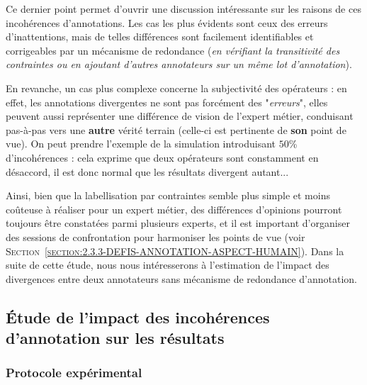 			\begin{leftBarAuthorOpinion}
				Ce dernier point permet d'ouvrir une discussion intéressante sur les raisons de ces incohérences d'annotations.
				Les cas les plus évidents sont ceux des erreurs d’inattentions, mais de telles différences sont facilement identifiables et corrigeables par un mécanisme de redondance (\textit{en vérifiant la transitivité des contraintes ou en ajoutant d'autres annotateurs sur un même lot d'annotation}).
				
				En revanche, un cas plus complexe concerne la subjectivité des opérateurs :
				en effet, les annotations divergentes ne sont pas forcément des "\textit{erreurs}", elles peuvent aussi représenter une différence de vision de l'expert métier, conduisant pas-à-pas vers une \textbf{autre} vérité terrain (celle-ci est pertinente de \textbf{son} point de vue).
				On peut prendre l'exemple de la simulation introduisant $50$\% d'incohérences : cela exprime que deux opérateurs sont constamment en désaccord, il est donc normal que les résultats divergent autant...
				
				Ainsi, bien que la labellisation par contraintes semble plus simple et moins coûteuse à réaliser pour un expert métier, des différences d'opinions pourront toujours être constatées parmi plusieurs experts, et il est important d'organiser des sessions de confrontation pour harmoniser les points de vue (voir \textsc{Section~\ref{section:2.3.3-DEFIS-ANNOTATION-ASPECT-HUMAIN}}).
				Dans la suite de cette étude, nous nous intéresserons à l'estimation de l'impact des divergences entre deux annotateurs sans mécanisme de redondance d'annotation.
			\end{leftBarAuthorOpinion}
	
	
	\subsection{Étude de l'impact des incohérences d'annotation sur les résultats}
	\label{section:4.6.2-ETUDE-ROBUSTESSE-SIMULATION-IMPACT-DIFFERENCES}
		
	
		\subsubsection{Protocole expérimental}
			
